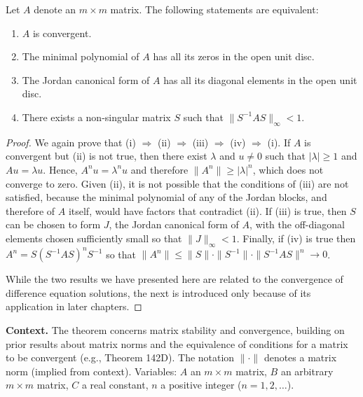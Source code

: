\begin{theorem}

  \label{thm:142D}
  \uses{}
Let \( A \) denote an \( m \times m \) matrix. The following statements are equivalent:
\begin{enumerate}
    \item[(i)] \( A \) is convergent.
    \item[(ii)] The minimal polynomial of \( A \) has all its zeros in the open unit disc.
    \item[(iii)] The Jordan canonical form of \( A \) has all its diagonal elements in the open unit disc.
    \item[(iv)] There exists a non-singular matrix \( S \) such that \( \| S^{-1} A S \|_{\infty} < 1 \).
\end{enumerate}
\end{theorem}

\begin{proof}

We again prove that (i) \(\Rightarrow\) (ii) \(\Rightarrow\) (iii) \(\Rightarrow\) (iv) \(\Rightarrow\) (i). If \( A \) is convergent but (ii) is not true, then there exist \( \lambda \) and \( u \neq 0 \) such that \( |\lambda| \geq 1 \) and \( Au = \lambda u \). Hence, \( A^{n} u = \lambda^{n} u \) and therefore \( \| A^{n} \| \geq |\lambda|^{n} \), which does not converge to zero. Given (ii), it is not possible that the conditions of (iii) are not satisfied, because the minimal polynomial of any of the Jordan blocks, and therefore of \( A \) itself, would have factors that contradict (ii). If (iii) is true, then \( S \) can be chosen to form \( J \), the Jordan canonical form of \( A \), with the off-diagonal elements chosen sufficiently small so that \( \| J \|_{\infty} < 1 \). Finally, if (iv) is true then \( A^{n} = S (S^{-1} A S)^{n} S^{-1} \) so that \( \| A^{n} \| \leq \| S \| \cdot \| S^{-1} \| \cdot \| S^{-1} A S \|^{n} \to 0 \).

While the two results we have presented here are related to the convergence of difference equation solutions, the next is introduced only because of its application in later chapters.
\end{proof}

\noindent\textbf{Context.}
The theorem concerns matrix stability and convergence, building on prior results about matrix norms and the equivalence of conditions for a matrix to be convergent (e.g., Theorem 142D). The notation $\|\cdot\|$ denotes a matrix norm (implied from context). Variables: $A$ an $m \times m$ matrix, $B$ an arbitrary $m \times m$ matrix, $C$ a real constant, $n$ a positive integer ($n = 1, 2, \dots$).

